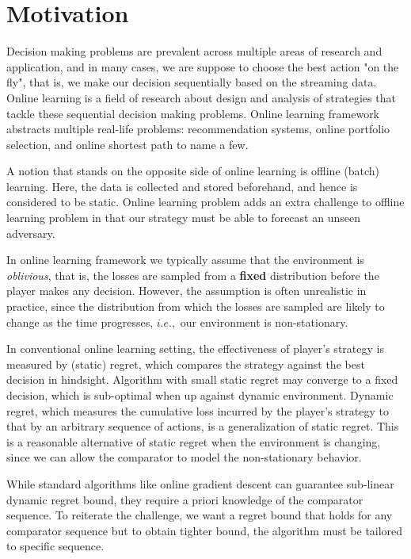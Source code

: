 \documentclass[12pt, a4paper]{report}
\begin{document}
\section{Motivation}
Decision making problems are prevalent across multiple areas of research and application, and in many cases, we are suppose to choose the best action "on the fly", that is, we make our decision sequentially based on the streaming data. Online learning is a field of research about design and analysis of strategies that tackle these sequential decision making problems. Online learning framework abstracts multiple real-life problems: recommendation systems, online portfolio selection, and online shortest path to name a few.

A notion that stands on the opposite side of online learning is offline (batch) learning. Here, the data is collected and stored beforehand, and hence is considered to be static. Online learning problem adds an extra challenge to offline learning problem in that our strategy must be able to forecast an unseen adversary.

In online learning framework we typically assume that the environment is \textit{oblivious}, that is, the losses are sampled from a \textbf{fixed} distribution before the player makes any decision. However, the assumption is often unrealistic in practice, since the distribution from which the losses are sampled are likely to change as the time progresses, $i.e.,$ our environment is non-stationary. 

In conventional online learning setting, the effectiveness of player's strategy is measured by (static) regret, which compares the strategy against the best decision in hindsight. Algorithm with small static regret may converge to a fixed decision, which is sub-optimal when up against dynamic environment. Dynamic regret, which measures the cumulative loss incurred by the player's strategy to that by an arbitrary sequence of actions, is a generalization of static regret. This is a reasonable alternative of static regret when the environment is changing, since we can allow the comparator to model the non-stationary behavior. 

While standard algorithms like online gradient descent can guarantee sub-linear dynamic regret bound, they require a priori knowledge of the comparator sequence. To reiterate the challenge, we want a regret bound that holds for any comparator sequence but to obtain tighter bound, the algorithm must be tailored to specific sequence. 
\end{document}
